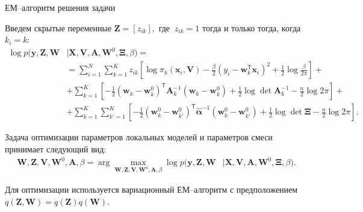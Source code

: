\documentclass[10pt,pdf,hyperref={unicode}]{beamer}
\begin{document}
\begin{frame}{ЕМ--алгоритм решения задачи}
\justifying

Введем скрытые переменные $\textbf{Z} = [z_{ik}],$ где $~z_{ik} = 1$ тогда и только тогда, когда $k_i=k$:
\[
\begin{aligned}
\log p\bigr(\mathbf{y}, \mathbf{Z}, \mathbf{W}&|\mathbf{X}, \mathbf{V}, \textbf{A}, \textbf{W}^{0},  \bm{\Xi}, \beta\bigr) =\\
&= \sum_{i=1}^{N}\sum_{k=1}^{K}z_{ik}\left[\log\pi_k\left(\textbf{x}_i, \textbf{V}\right) - \frac{\beta}{2}\left(y_{i} - \textbf{w}_{k}^{\mathsf{T}}\textbf{x}_{i}\right)^{2} + \frac{1}{2}\log\frac{\beta}{2\pi}\right] +\\
&+ \sum_{k=1}^{K}\left[-\frac{1}{2}\left(\textbf{w}_{k} - \textbf{w}_{k}^{0}\right)^{\mathsf{T}}\textbf{A}_{k}^{-1}\left(\textbf{w}_{k} - \textbf{w}_{k}^{0}\right) + \frac{1}{2}\log\det\textbf{A}^{-1}_{k} - \frac{n}{2}\log2\pi\right]+\\
&+ \sum_{k=1}^{K}\sum_{k'=1}^{K}\left[-\frac{1}{2}\left(\textbf{w}_{k}^{0}-\textbf{w}_{k'}^{0}\right)^{\mathsf{T}}\hat{\bm{\alpha}}^{-1}\left(\textbf{w}_{k}^{0}-\textbf{w}_{k'}^{0}\right) +\frac{1}{2}\log\det \bm{\Xi} -\frac{n}{2}\log{2\pi}\right].
\end{aligned}
\]

Задача оптимизации параметров локальных моделей и параметров смеси принимает следующий вид:
\begin{equation*}
\begin{aligned}
\mathbf{W}, \mathbf{Z}, \mathbf{V}, \mathbf{W}^0, \textbf{A},  \beta = \arg\max_{\mathbf{W}, \mathbf{Z}, \mathbf{V}, \mathbf{W}^0, \textbf{A}, \beta} \log p\bigr(\mathbf{y}, \mathbf{Z}, \mathbf{W}&|\mathbf{X}, \mathbf{V}, \textbf{A}, \textbf{W}^{0}, \bm{\Xi}, \beta\bigr).
\end{aligned}
\end{equation*}

Для оптимизации используется вариационный ЕМ--алгоритм с предположением~$q\left(\textbf{Z}, \textbf{W}\right) = q\left(\textbf{Z}\right)q\left(\textbf{W}\right)$.
\end{frame}
\end{document}
